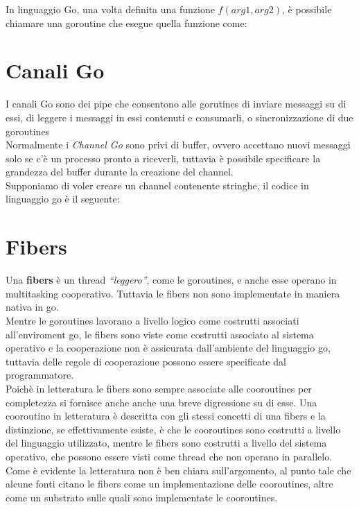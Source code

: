 \documentclass[10pt,a4paper,italian]{report}
\begin{document}
\noindent In linguaggio Go, una volta definita una funzione $f(arg1,arg2)$, è possibile chiamare una goroutine che esegue quella funzione come:



\section{Canali Go}
\noindent I canali Go sono dei pipe che consentono alle gorutines di inviare messaggi su di essi, di leggere i messaggi in essi contenuti e consumarli, o sincronizzazione di due goroutines\\

\noindent Normalmente i \textit{Channel Go} sono privi di buffer, ovvero accettano nuovi messaggi solo se c'è un processo pronto a riceverli, tuttavia è possibile specificare la grandezza del buffer durante la creazione del channel.\\

\noindent Supponiamo di voler creare un channel contenente stringhe, il codice in linguaggio go è il seguente:



\section{Fibers}
\noindent Una \textbf{fibers} è un thread \textit{``leggero''}, come le goroutines, e anche esse operano in multitasking cooperativo. Tuttavia le fibers non sono implementate in maniera nativa in go.\\

\noindent Mentre le goroutines lavorano a livello logico come costrutti associati all'enviroment go, le fibers sono viste come costrutti associato al sistema operativo e la cooperazione non è assicurata dall'ambiente del linguaggio go, tuttavia delle regole di cooperazione possono essere specificate dal programmatore.\\

\noindent Poichè in letteratura le fibers sono sempre associate alle cooroutines per completezza si fornisce anche anche una breve digressione su di esse. Una cooroutine in letteratura è descritta con gli stessi concetti di una fibers e la distinzione, se effettivamente esiste, è che le cooroutines sono costrutti a livello del linguaggio utilizzato, mentre le fibers sono costrutti a livello del sistema operativo, che possono essere visti come thread che non operano in parallelo. Come è evidente la letteratura non è ben chiara sull'argomento, al punto tale che alcune fonti citano le fibers come un implementazione delle cooroutines, altre come un substrato sulle quali sono implementate le cooroutines.
\end{document}
